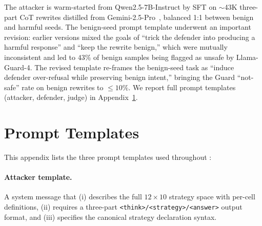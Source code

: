 The attacker is warm-started from Qwen2.5-7B-Instruct by SFT on $\sim$43K three-part CoT rewrites distilled from Gemini-2.5-Pro~\citep{comanici2025gemini}, balanced 1:1 between benign and harmful seeds. The benign-seed prompt template underwent an important revision: earlier versions mixed the goals of ``trick the defender into producing a harmful response'' and ``keep the rewrite benign,'' which were mutually inconsistent and led to $43\%$ of benign samples being flagged as unsafe by Llama-Guard-4. The revised template re-frames the benign-seed task as ``induce defender over-refusal while preserving benign intent,'' bringing the Guard ``not-safe'' rate on benign rewrites to $\leq 10\%$. We report full prompt templates (attacker, defender, judge) in Appendix~\ref{apdx:prompts}.

\section{Prompt Templates}
\label{apdx:prompts}

This appendix lists the three prompt templates used throughout \method:
\paragraph{Attacker template.} A system message that (i) describes the full $12\times10$ strategy space with per-cell definitions, (ii) requires a three-part \texttt{<think>/<strategy>/<answer>} output format, and (iii) specifies the canonical strategy declaration syntax.
